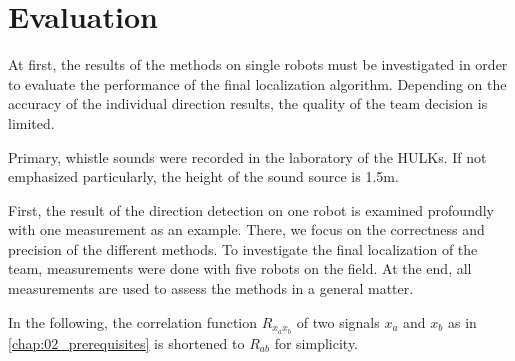 \chapter{Evaluation}

At first, the results of the methods on single robots must be investigated
in order to evaluate the performance of the final localization algorithm.
Depending on the accuracy of the individual direction results, the quality
of the team decision is limited.

Primary, whistle sounds were recorded in the laboratory of the HULKs.
If not emphasized particularly, the height of the sound source is 1.5\si{m}.

First, the result of the direction detection on one robot
is examined profoundly with one measurement as an example.
There, we focus on the correctness and precision of the different methods.
To investigate the final localization of the team, measurements were
done with five robots on the field.
At the end, all measurements are used to assess the methods in a general matter.

In the following, the correlation function $R_{x_ax_b}$ of two signals
$x_a$ and $x_b$ as in \cref{chap:02_prerequisites} is shortened
to $R_{ab}$ for simplicity.




